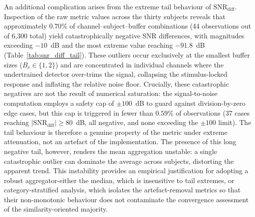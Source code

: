 \documentclass[MScCS,12pt,oneside,final]{uccthesis}
\begin{document}
An additional complication arises from the extreme tail behaviour of $\mathrm{SNR}_{\mathrm{diff}}$. Inspection of the raw metric values across the thirty subjects reveals that approximately $0.70\%$ of channel--subject--buffer combinations (44 observations out of 6,300 total) yield catastrophically negative SNR differences, with magnitudes exceeding $-10$~dB and the most extreme value reaching $-91.8$~dB (Table~\ref{tab:snr_diff_tail}). These outliers occur exclusively at the smallest buffer sizes ($B_s \in \{1, 2\}$) and are concentrated in individual channels where the undertrained detector over-trims the signal, collapsing the stimulus-locked response and inflating the relative noise floor. Crucially, these catastrophic negatives are not the result of numerical saturation: the signal-to-noise computation employs a safety cap of $\pm 100$~dB to guard against division-by-zero edge cases, but this cap is triggered in fewer than $0.59\%$ of observations (37 cases reaching $|\mathrm{SNR}_{\mathrm{diff}}| \geq 80$~dB, all negative, and none exceeding the $\pm 100$ limit). The tail behaviour is therefore a genuine property of the metric under extreme attenuation, not an artefact of the implementation. The presence of this long negative tail, however, renders the mean aggregation unstable: a single catastrophic outlier can dominate the average across subjects, distorting the apparent trend. This instability provides an empirical justification for adopting a robust aggregator-either the median, which is insensitive to tail extremes, or category-stratified analysis, which isolates the artefact-removal metrics so that their non-monotonic behaviour does not contaminate the convergence assessment of the similarity-oriented majority.
\end{document}
